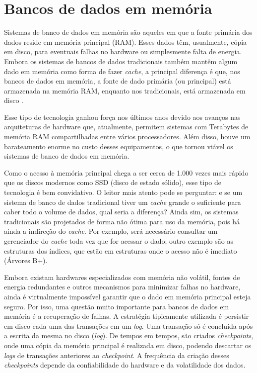 \section{Bancos de dados em memória}
\label{sec:memoria}

Sistemas de banco de dados em memória são aqueles em que a fonte primária dos dados reside 
em memória principal (RAM). Esses dados têm, usualmente, cópia em disco, para eventuais falhas 
no hardware ou simplesmente falta de energia. Embora os sistemas de bancos de dados tradicionais 
também mantêm algum dado em memória como forma de fazer \textit{cache}, a principal diferença é 
que, nos bancos de dados em memória, a fonte de dado primária (ou principal) está 
armazenada na memória RAM, enquanto nos tradicionais, está armazenada em disco 
\citep{garcia1992main, dewitt1984implementation}.

Esse tipo de tecnologia ganhou força nos últimos anos devido aos avanços nas arquiteturas de 
hardware que, atualmente, permitem sistemas com Terabytes de memória RAM compartilhadas entre 
vários processadores. Além disso, houve um barateamento enorme no custo desses equipamentos, o 
que tornou viável os sistemas de banco de dados em memória. 

Como o acesso à memória principal chega a ser cerca de 1.000 vezes mais rápido que os discos modernos 
como SSD (disco de estado sólido), esse tipo de tecnologia é bem convidativo. O leitor mais atento 
pode se perguntar: e se um sistema de banco de dados tradicional tiver um \textit{cache} grande o 
suficiente para caber todo o volume de dados, qual seria a diferença? Ainda sim, os sistemas tradicionais são 
projetados de forma não ótima para uso da memória, pois há ainda a indireção do \textit{cache}. 
Por exemplo, será necessário consultar um gerenciador do \textit{cache} toda vez que for acessar o dado;
outro exemplo são as estruturas dos índices, que estão em estruturas onde o acesso não é imediato (Árvores B+). 

Embora existam hardwares especializados com memória não volátil, fontes de energia redundantes e 
outros mecanismos para minimizar falhas no hardware, ainda é virtualmente impossível garantir que o 
dado em memória principal esteja seguro. Por isso, uma questão muito importante para bancos de dados 
em memória é a recuperação de falhas. A estratégia tipicamente utilizada 
é persistir em disco cada uma das transações em um \textit{log}. Uma transação só é concluída após a 
escrita da mesma no disco (\textit{log}). De tempos em tempos, são criados \textit{checkpoints}, onde 
uma cópia da memória principal é realizada em disco, podendo descartar os \textit{logs} de transações 
anteriores ao \textit{checkpoint}. A frequência da criação desses \textit{checkpoints} depende da 
confiabilidade do hardware e da volatilidade dos dados.

